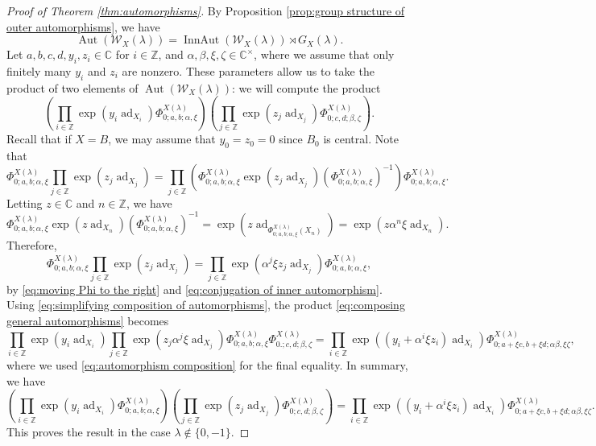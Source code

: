 \documentclass[11pt, svgnames]{amsart}
\DeclareMathOperator{\ad}{ad}
\newcommand{\ZZ}{\mathbb{Z}}
\newcommand{\CC}{\mathbb{C}}
\newcommand{\W}{\mathcal{W}}
\DeclareMathOperator{\Aut}{Aut}
\DeclareMathOperator{\InnAut}{InnAut}
\theoremstyle{definition}
\begin{document}
\begin{proof}[Proof of Theorem \ref{thm:automorphisms}]
    By Proposition \ref{prop:group structure of outer automorphisms}, we have
    $$\Aut(\W_X(\lambda)) = \InnAut(\W_X(\lambda)) \rtimes G_X(\lambda).$$
    Let $a,b,c,d,y_i,z_i \in \CC$ for $i \in \ZZ$, and $\alpha,\beta,\xi,\zeta \in \CC^\times$, where we assume that only finitely many $y_i$ and $z_i$ are nonzero. These parameters allow us to take the product of two elements of $\Aut(\W_X(\lambda))$: we will compute the product
    \begin{equation}\label{eq:composing general automorphisms}
        \left(\prod_{i \in \ZZ} \exp(y_i\ad_{X_i}) \Phi_{0;a,b;\alpha,\xi}^{X(\lambda)}\right) \left(\prod_{j \in \ZZ} \exp(z_j\ad_{X_j}) \Phi_{0;c,d;\beta,\zeta}^{X(\lambda)}\right).
    \end{equation}
    Recall that if $X = B$, we may assume that $y_0 = z_0 = 0$ since $B_0$ is central. Note that
    \begin{equation}\label{eq:moving Phi to the right}
        \Phi_{0;a,b;\alpha,\xi}^{X(\lambda)} \prod_{j \in \ZZ} \exp(z_j\ad_{X_j}) = \prod_{j \in \ZZ}\left(\Phi_{0;a,b;\alpha,\xi}^{X(\lambda)} \exp(z_j\ad_{X_j}) (\Phi_{0;a,b;\alpha,\xi}^{X(\lambda)})^{-1}\right) \Phi_{0;a,b;\alpha,\xi}^{X(\lambda)}.
    \end{equation}
    Letting $z \in \CC$ and $n \in \ZZ$, we have
    \begin{equation}
        \Phi_{0;a,b;\alpha,\xi}^{X(\lambda)} \exp(z\ad_{X_n}) (\Phi_{0;a,b;\alpha,\xi}^{X(\lambda)})^{-1} = \exp\left(z \ad_{\Phi_{0;a,b;\alpha,\xi}^{X(\lambda)}(X_n)}\right) \label{eq:conjugation of inner automorphism} = \exp(z \alpha^n \xi \ad_{X_n}).
    \end{equation}
    Therefore,
    \begin{equation}\label{eq:simplifying composition of automorphisms}
        \Phi_{0;a,b;\alpha,\xi}^{X(\lambda)} \prod_{j \in \ZZ} \exp(z_j\ad_{X_j}) = \prod_{j \in \ZZ} \exp(\alpha^j \xi z_j \ad_{X_j}) \Phi_{0;a,b;\alpha,\xi}^{X(\lambda)},
    \end{equation}
    by \eqref{eq:moving Phi to the right} and \eqref{eq:conjugation of inner automorphism}. Using \eqref{eq:simplifying composition of automorphisms}, the product \eqref{eq:composing general automorphisms} becomes
    $$\prod_{i \in \ZZ} \exp(y_i\ad_{X_i}) \prod_{j \in \ZZ} \exp(z_j \alpha^j \xi \ad_{X_j}) \Phi_{0;a,b;\alpha,\xi}^{X(\lambda)} \Phi_{0.;c,d;\beta,\zeta}^{X(\lambda)} = \prod_{i \in \ZZ} \exp((y_i + \alpha^i \xi z_i)\ad_{X_i})\Phi_{0;a + \xi c, b + \xi d; \alpha \beta, \xi \zeta}^{X(\lambda)},$$
    where we used \eqref{eq:automorphism composition} for the final equality. In summary, we have
    $$\left(\prod_{i \in \ZZ} \exp(y_i\ad_{X_i}) \Phi_{0;a,b;\alpha,\xi}^{X(\lambda)}\right) \left(\prod_{j \in \ZZ} \exp(z_j\ad_{X_j}) \Phi_{0;c,d;\beta,\zeta}^{X(\lambda)}\right) = \prod_{i \in \ZZ} \exp\left((y_i + \alpha^i \xi z_i)\ad_{X_i}\right)\Phi_{0;a + \xi c, b + \xi d; \alpha \beta, \xi \zeta}^{X(\lambda)}.$$
    This proves the result in the case $\lambda \notin \{0,-1\}$.


\end{proof}
\end{document}
